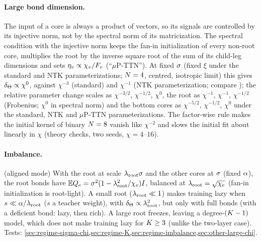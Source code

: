 \paragraph{Large bond dimension.} \derived{}  The input of a core is always a product of vectors, so
its signals are controlled by its injective norm, not by the spectral norm of its matricization. The
spectral condition with the injective norm keeps the fan-in initialization of every non-root core,
multiplies the root by the inverse square root of the sum of its child-leg dimensions and sets $\eta_{v}\propto\chi_{v}/F_{v}$
(``$\mu$P-TTN''). At fixed $\sigma$ (fixed $\xi$ under the standard and NTK parameterizations; $N=4$, centred,
isotropic limit) this gives $\delta_{\Theta}\propto\chi^0$, against $\chi^{-3}$ (standard) and $\chi^{-1}$ (NTK
parameterization; compare \citealp{guo2021neural}); the relative parameter change scales as $\chi^{-3/2}$,
$\chi^{-1/2}$, $\chi^0$, the root as $\chi^{-1}$, $\chi^{-1}$, $\chi^{-1/2}$ (Frobenius; $\chi^0$ in spectral norm) and
the bottom cores as $\chi^{-5/2}$, $\chi^{-1/2}$, $\chi^0$ under the standard, NTK and $\mu$P-TTN
parameterizations. The factor-wise rule makes the initial kernel of binary $N=8$ vanish like $\chi^{-2}$ and
slows the initial fit about linearly in $\chi$ \empirical{} (theory checks, two seeds, $\chi=4$--$16$).

\paragraph{Imbalance.} \derived{} (aligned mode)  With the root at scale $\lambda_{\rm root}\sigma$ and the other cores at $\sigma$ (fixed $\alpha$), the
root bonds have $\mathbb{E}Q_{e}=\sigma^2(1-\lambda_{\rm root}^2/\chi_{e})I$, balanced at $\lambda_{\rm root}=\sqrt{\chi_{e}}$ (fan-in initialization
is root-light). A small root ($\lambda_{\rm root}\ll1$) makes training lazy when $s\ll\alpha/\lambda_{\rm root}$ ($s$ a teacher
weight), with $\delta_{\Theta}\propto\lambda_{\rm root}^2$, but only with full bonds (with a deficient bond: lazy, then rich). A
large root freezes, leaving a degree-$(K-1)$ model, which does not make training lazy for $K\ge3$
(unlike the two-layer case). Tests: \cref{sec:regime-sigma-chi,sec:regime-K,sec:regime-imbalance,sec:other-large-chi}.
